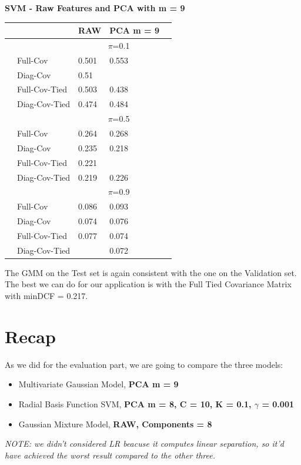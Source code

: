 \documentclass[english]{report}
\begin{document}
\textbf{SVM - Raw Features and PCA with m = 9}
\begin{table}[H]
    \centering
    \begin{tabular}{ll|l|ll}
        \hline
                                & & RAW & PCA m = 9 \\ \hline
                                & & \multicolumn{2}{c}{$\pi$=0.1} \\ \hline
                                & Full-Cov        & 0.501  & 0.553 \\
                                & Diag-Cov        & 0.51 & \color{red}{0.467} \\
                                & Full-Cov-Tied   & 0.503 & 0.438 \\ 
                                & Diag-Cov-Tied   & 0.474 & 0.484 \\ \hline

                                & & \multicolumn{2}{c}{$\pi$=0.5} \\ \hline
                                & Full-Cov          & 0.264  & 0.268   \\
                                & Diag-Cov          & 0.235  & 0.218 \\
                                & Full-Cov-Tied     & 0.221  & \color{red}{0.217} \\ 
                                & Diag-Cov-Tied     & 0.219  & 0.226 \\ \hline

                                & & \multicolumn{2}{c}{$\pi$=0.9} \\ \hline
                                & Full-Cov          & 0.086  & 0.093  \\
                                & Diag-Cov          & 0.074  & 0.076\\
                                & Full-Cov-Tied     & 0.077  & 0.074\\ 
                                & Diag-Cov-Tied     & \color{red}{0.071}  & 0.072\\  
    \hline
    \end{tabular}
    \label{tab:SVM_RAW_eval}
\end{table}
The GMM on the Test set is again consistent with the one on the Validation set.
The best we can do for our application is with the Full Tied Covariance Matrix with minDCF = 0.217.

\newpage
\section{Recap}
As we did for the evaluation part, we are going to compare the three models:
\begin{itemize}
    \item Multivariate Gaussian Model, \textbf{PCA m = 9}
    \item Radial Basis Function SVM, \textbf{PCA m = 8, C = 10, K = 0.1, $\gamma$ = 0.001}
    \item Gaussian Mixture Model, \textbf{RAW, Components = 8}
\end{itemize}
\textit{NOTE: we didn't considered LR beacuse it computes linear separation, so it'd have achieved the worst
result compared to the other three.}
\end{document}
